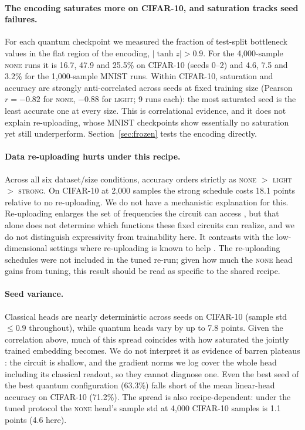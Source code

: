 \documentclass[10pt]{article}
\begin{document}
\paragraph{The encoding saturates more on CIFAR-10, and saturation tracks seed failures.}
For each quantum checkpoint we measured the fraction of test-split bottleneck
values in the flat region of the encoding, $|\tanh z| > 0.9$. For the
4{,}000-sample \textsc{none} runs it is 16.7, 47.9 and 25.5\% on CIFAR-10
(seeds 0--2) and 4.6, 7.5 and 3.2\% for the 1{,}000-sample MNIST runs. Within
CIFAR-10, saturation and accuracy are strongly anti-correlated across seeds at
fixed training size (Pearson $r=-0.82$ for \textsc{none}, $-0.88$ for
\textsc{light}; 9 runs each): the most saturated seed is the least accurate one
at every size. This is correlational evidence, and it does not explain
re-uploading, whose MNIST checkpoints show essentially no saturation yet still
underperform. Section~\ref{sec:frozen} tests the encoding directly.

\paragraph{Data re-uploading hurts under this recipe.}
Across all six dataset/size conditions, accuracy orders strictly as
\textsc{none} $>$ \textsc{light} $>$ \textsc{strong}. On CIFAR-10 at 2{,}000
samples the strong schedule costs 18.1 points relative to no re-uploading.
We do not have a mechanistic explanation for this. Re-uploading enlarges the
set of frequencies the circuit can access \citep{schuld2021effect}, but that
alone does not determine which functions these fixed circuits can realize, and
we do not distinguish expressivity from trainability here. It contrasts
with the low-dimensional settings where re-uploading is known to help
\citep{perez2020data}. The re-uploading schedules were not included in the
tuned re-run; given how much the \textsc{none} head gains from tuning, this
result should be read as specific to the shared recipe.

\paragraph{Seed variance.}
Classical heads are nearly deterministic across seeds on CIFAR-10 (sample std
$\leq 0.9$ throughout), while quantum heads vary by up to 7.8 points. Given the
correlation above, much of this spread coincides with how saturated the
jointly trained embedding becomes. We do not interpret it as evidence of barren
plateaus \citep{mcclean2018barren}: the circuit is shallow, and the gradient norms we log cover the whole
head including its classical readout, so they cannot diagnose one. Even the best
seed of the best quantum configuration (63.3\%) falls short of the mean
linear-head accuracy on CIFAR-10 (71.2\%). The spread is also
recipe-dependent: under the tuned protocol the \textsc{none} head's sample std
at 4{,}000 CIFAR-10 samples is 1.1 points (4.6 here).
\end{document}
